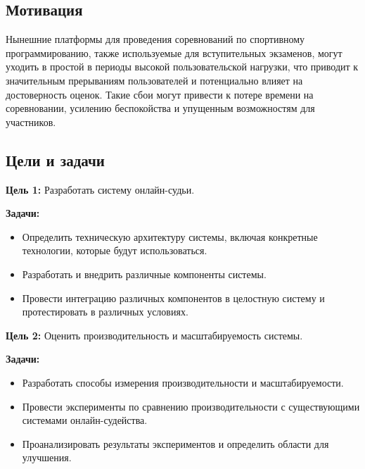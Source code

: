\subsection{Мотивация}
Нынешние платформы для проведения соревнований по спортивному программированию, также используемые для вступительных экзаменов, могут уходить в простой в периоды высокой пользовательской нагрузки, что приводит к значительным прерываниям пользователей и потенциально влияет на достоверность оценок.
\noindent
Такие сбои могут привести к потере времени на соревновании, усилению беспокойства и упущенным возможностям для участников.

\subsection{Цели и задачи}

\textbf{Цель 1:} Разработать систему онлайн-судьи.

\textbf{Задачи:}
\begin{itemize}
    \itemsep 0em 
    \item Определить техническую архитектуру системы, включая конкретные технологии, которые будут использоваться.
    \item Разработать и внедрить различные компоненты системы.
    \item Провести интеграцию различных компонентов в целостную систему и протестировать в различных условиях.  
\end{itemize}

\noindent
\textbf{Цель 2:} Оценить производительность и масштабируемость системы.

\textbf{Задачи:}
\begin{itemize}
    \itemsep 0em
    \item Разработать способы измерения производительности и масштабируемости.
    \item Провести эксперименты по сравнению производительности с существующими системами онлайн-судейства.
    \item Проанализировать результаты экспериментов и определить области для улучшения.
\end{itemize}



